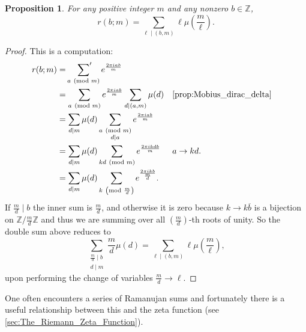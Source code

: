 \documentclass[12pt]{book}
\newtheorem{proposition}{Proposition}[section]
\theoremstyle{definition}\newframedtheorem{method}{Method}
\newcommand{\psum}{\sideset{}{'}\sum}
\newcommand{\tmod}[1]{\ \left(\text{mod }#1\right)}
\newcommand{\Z}{\mathbb{Z}}
\newcommand{\<}{\langle}
\renewcommand{\>}{\rangle}
\newcommand{\conj}{\overline}
\begin{document}
      \begin{proposition}\label{prop:Ramanujan_sum_evaluation}
        For any positive integer $m$ and any nonzero $b \in \Z$,
        \[
          r(b;m) = \sum_{\ell \mid (b,m)}\ell\mu\left(\frac{m}{\ell}\right).
        \]
      \end{proposition}
      \begin{proof}
        This is a computation:
        \begin{align*}
          r(b;m) &= \psum_{a \tmod{m}}e^{\frac{2\pi iab}{m}} \\
          &= \sum_{a \tmod{m}}e^{\frac{2\pi iab}{m}}\sum_{d \mid (a,m)}\mu(d) && \text{\cref{prop:Mobius_dirac_delta}} \\
          &= \sum_{d \mid m}\mu(d)\sum_{\substack{a \tmod{m} \\ d \mid a}}e^{\frac{2\pi iab}{m}} \\
          &= \sum_{d \mid m}\mu(d)\sum_{kd \tmod{m}}e^{\frac{2\pi ikdb}{m}} && \text{$a \to kd$.} \\
          &= \sum_{d \mid m}\mu(d)\sum_{k \tmod{\frac{m}{d}}}e^{\frac{2\pi ik b}{\frac{m}{d}}}.
        \end{align*}
        If $\frac{m}{d} \mid b$ the inner sum is $\frac{m}{d}$, and otherwise it is zero because $k \to k\conj{b}$ is a bijection on $\Z/\frac{m}{d}\Z$ and thus we are summing over all $\left(\frac{m}{d}\right)$-th roots of unity. So the double sum above reduces to
        \[
          \sum_{\substack{\frac{m}{d} \mid b \\ d \mid m}}\frac{m}{d}\mu(d) = \sum_{\ell \mid (b,m)}\ell\mu\left(\frac{m}{\ell}\right),
        \]
        upon performing the change of variables $\frac{m}{d} \to \ell$.
      \end{proof}

      One often encounters a series of Ramanujan sums and fortunately there is a useful relationship between this and the zeta function (see \cref{sec:The_Riemann_Zeta_Function}).
\end{document}
